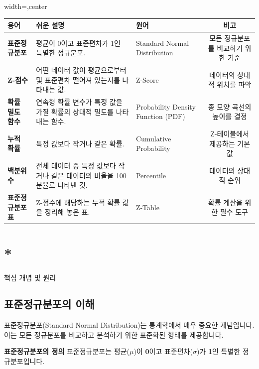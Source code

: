\documentclass[11pt,a4paper]{article}
\theoremstyle{definition}
\newcommand{\newsection}[1]{\newpage\section{#1}}
\begin{document}
\begin{adjustbox}{width=\textwidth,center}
\begin{tabular}{lllc}
\toprule
\textbf{용어} & \textbf{쉬운 설명} & \textbf{원어} & \textbf{비고} \\
\midrule
\textbf{표준정규분포} & 평균이 0이고 표준편차가 1인 특별한 정규분포. & Standard Normal Distribution & 모든 정규분포를 비교하기 위한 기준 \\
\textbf{Z-점수} & 어떤 데이터 값이 평균으로부터 몇 표준편차 떨어져 있는지를 나타내는 값. & Z-Score & 데이터의 상대적 위치를 파악 \\
\textbf{확률 밀도 함수} & 연속형 확률 변수가 특정 값을 가질 확률의 상대적 밀도를 나타내는 함수. & Probability Density Function (PDF) & 종 모양 곡선의 높이를 결정 \\
\textbf{누적 확률} & 특정 값보다 작거나 같은 확률. & Cumulative Probability & Z-테이블에서 제공하는 기본 값 \\
\textbf{백분위수} & 전체 데이터 중 특정 값보다 작거나 같은 데이터의 비율을 100분율로 나타낸 것. & Percentile & 데이터의 상대적 순위 \\
\textbf{표준정규분포표} & Z-점수에 해당하는 누적 확률 값을 정리해 놓은 표. & Z-Table & 확률 계산을 위한 필수 도구 \\
\bottomrule
\end{tabular}
\end{adjustbox}

\newsection*{핵심 개념 및 원리}

\subsection{표준정규분포의 이해}
표준정규분포(Standard Normal Distribution)는 통계학에서 매우 중요한 개념입니다. 이는 모든 정규분포를 비교하고 분석하기 위한 표준화된 형태를 제공합니다.

\begin{definitionbox}
\textbf{표준정규분포의 정의}
표준정규분포는 평균($\mu$)이 \textbf{0}이고 표준편차($\sigma$)가 \textbf{1}인 특별한 정규분포입니다.
\end{definitionbox}
\end{document}
